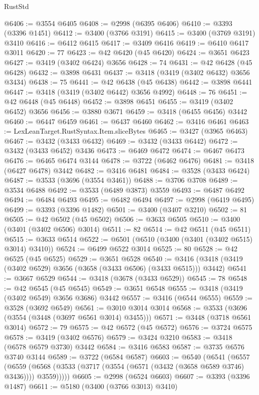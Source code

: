 \begin{lexlean}{RustStd}
\begin{coremodule}
@6406 := @3554 @6405
@6408 := @2998 (@6395 @6406)
@6410 := @3393 (@3396 @1451)
@6412 := @3400 (@3766 @3191)
@6415 := @3400 (@3769 @3191) @3410
@6416 := @6412 @6415
@6417 := @3409 @6416
@6419 := @6410 @6417 @3011
@6420 := 77
@6423 := @42 @6420 (@45 @6420)
@6424 := @3651 @6423
@6427 := @3419 (@3402 @6424) @3656
@6428 := 74
@6431 := @42 @6428 (@45 @6428)
@6432 := @3898 @6431
@6437 := @3418 (@3419 (@3402 @6432) @3656 @3434)
@6438 := 75
@6441 := @42 @6438 (@45 @6438)
@6442 := @3898 @6441
@6447 := @3418 (@3419 (@3402 @6442) @3656 @4992)
@6448 := 76
@6451 := @42 @6448 (@45 @6448)
@6452 := @3898 @6451
@6455 := @3419 (@3402 @6452) @3656
@6456 := @3880 @3671
@6459 := @3418 (@6455 @6456) @3442
@6460 := @6447 @6459
@6461 := @6437 @6460
@6462 := @3416 @6461
@6463 := LexLeanTarget.RustSyntax.Item.sliceBytes
@6465 := @3427 (@3965 @6463)
@6467 := @3432 (@3433 @6432)
@6469 := @3432 (@3433 @6442)
@6472 := @3432 (@3433 @6452) @3436
@6473 := @6469 @6472
@6474 := @6467 @6473
@6476 := @6465 @6474 @3144
@6478 := @3722 (@6462 @6476)
@6481 := @3418 (@6427 @6478) @3442
@6482 := @3416 @6481
@6484 := @3528 (@3433 @6424)
@6487 := @3533 (@3696 (@3554 @3461))
@6488 := @3706 @3708
@6489 := @3534 @6488
@6492 := @3533 (@6489 @3873) @3559
@6493 := @6487 @6492
@6494 := @6484 @6493
@6495 := @6482 @6494
@6497 := @2998 (@6419 @6495)
@6499 := @3393 (@3396 @1482)
@6501 := @3400 (@3407 @3210)
@6502 := 81
@6505 := @42 @6502 (@45 @6502)
@6506 := @3633 @6505
@6510 := @3400 (@3401 (@3402 @6506) @3014)
@6511 := 82
@6514 := @42 @6511 (@45 @6511)
@6515 := @3633 @6514
@6522 := @6501 (@6510 (@3400 (@3401 (@3402 @6515) @3014) @3410))
@6524 := @6499 @6522 @3014
@6525 := 80
@6528 := @42 @6525 (@45 @6525)
@6529 := @3651 @6528
@6540 := @3416 (@3418 (@3419 (@3402 @6529) @3656 (@3658 (@3433 @6506) (@3433 @6515))) @3442)
@6541 := @3667 @6529
@6544 := @3418 (@3678 (@3433 @6529))
@6545 := 78
@6548 := @42 @6545 (@45 @6545)
@6549 := @3651 @6548
@6555 := @3418 (@3419 (@3402 @6549) @3656 @3686) @3442
@6557 := @3416 (@6544 @6555)
@6559 := @3528 (@3692 @6549)
@6561 := @3010 @3014 @3014
@6568 := @3533 (@3696 (@3554 (@3448 (@3697 @6561 @3014) @3455)))
@6571 := @3448 (@3718 @6561 @3014)
@6572 := 79
@6575 := @42 @6572 (@45 @6572)
@6576 := @3724 @6575
@6578 := @3419 (@3402 @6576)
@6579 := @3424 @3210
@6583 := @3418 (@6578 @6579 @3730) @3442
@6584 := @3416 @6583
@6587 := @3735 @6576 @3740 @3144
@6589 := @3722 (@6584 @6587)
@6603 := @6540
    (@6541
      (@6557
        (@6559 (@6568 (@3533 (@3717 (@3554 (@6571 (@3432 (@3658 @6589 @3746) @3436)))) @3559)))))
@6605 := @2998 (@6524 @6603)
@6607 := @3393 (@3396 @1487)
@6611 := @5180 (@3400 (@3766 @3013) @3410)

\end{coremodule}
\end{lexlean}
